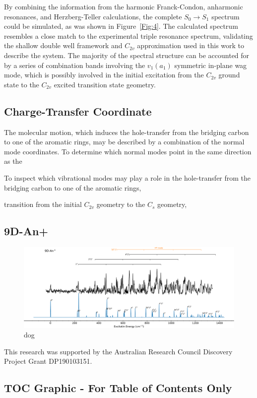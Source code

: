 \documentclass[journal=jpcafh,manuscript=article,layout=onecolumn, 12pt]{achemso}
\begin{document}
By combining the information from the harmonic Franck-Condon, anharmonic resonances, and Herzberg-Teller calculations, the complete $S_0\rightarrow S_1$ spectrum could be simulated, as was shown in Figure~\ref{Fig:4}. The calculated spectrum resembles a close match to the experimental triple resonance spectrum, validating the shallow double well framework and $C_{2v}$ approximation used in this work to describe the system. The majority of the spectral structure can be accounted for by a series of combination bands involving the $v_1(a_1)$ symmetric in-plane wag mode, which is possibly involved in the initial excitation from the $C_{2v}$ ground state to the $C_{2v}$ excited transition state geometry. 

\subsection{Charge-Transfer Coordinate}
The molecular motion, which induces the hole-transfer from the bridging carbon to one of the aromatic rings, may be described by a combination of the normal mode coordinates. To determine which normal modes point in the same direction as the 

To inspect which vibrational modes may play a role in the hole-transfer from the bridging carbon to one of the aromatic rings,  

 transition from the initial $C_{2v}$ geometry to the $C_{s}$ geometry, 

\subsection{9D-An+}

\begin{figure} [h]
	\includegraphics[width=1\textwidth]{figures/9D-An+w}
	\caption{dog}
	\label{Fig:5}
\end{figure}

\begin{acknowledgement}
	This research was supported by the Australian Research Council Discovery
	Project Grant DP190103151.  
\end{acknowledgement}



\newpage
\onecolumn
\subsection{TOC Graphic - For Table of Contents Only}
\vspace{2ex}
\begin{center}
\end{center}
\end{document}
